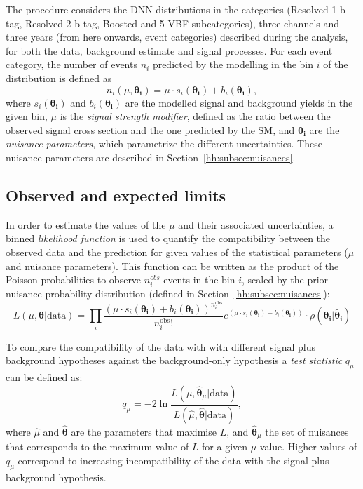 \documentclass[../main.tex]{subfiles}
\begin{document}
The procedure considers the DNN distributions in the categories (Resolved 1 b-tag, Resolved 2 b-tag, Boosted and 5 VBF subcategories), three channels and three years (from here onwards, event categories) described during the analysis, for both the data, background estimate and signal processes. For each event category, the number of events $n_i$ predicted by the modelling in the bin $i$ of the distribution is defined as
\begin{equation}
n_i(\mu, \boldsymbol{\theta_i})=\mu\cdot s_i (\boldsymbol{\theta_i}) + b_i(\boldsymbol{\theta_i}),
\end{equation}
where $s_i (\boldsymbol{\theta_i})$ and $b_i(\boldsymbol{\theta_i})$ are the modelled signal and background yields in the given bin, $\mu$ is the \textit{signal strength modifier}, defined as the ratio between the observed signal cross section and the one predicted by the SM, and $\boldsymbol{\theta_i}$ are the \textit{nuisance parameters}, which parametrize the different uncertainties. These nuisance parameters are described in Section~\ref{hh:subsec:nuisances}.

\subsection{Observed and expected limits}

In order to estimate the values of the $\mu$ and their associated uncertainties, a binned \textit{likelihood function} is used to quantify the compatibility between the observed data and the prediction for given values of the statistical parameters ($\mu$ and nuisance parameters). This function can be written as the product of the Poisson probabilities to observe $n_i^{obs}$ events in the bin $i$, scaled by the prior nuisance probability distribution (defined in Section~\ref{hh:subsec:nuisances}):
\begin{equation}
L(\mu, \boldsymbol{\theta} | \text{data}) = \prod_i \frac{\left(\mu\cdot s_i (\boldsymbol{\theta_i}) + b_i(\boldsymbol{\theta_i}) \right)^{n_i^\text{obs}}}{n_i^\text{obs}!}e^{(\mu\cdot s_i (\boldsymbol{\theta_i}) + b_i(\boldsymbol{\theta_i}))} \cdot \rho(\boldsymbol{\theta_i}|\boldsymbol{\tilde{\theta_i}})
\end{equation}

To compare the compatibility of the data with  with different signal plus background hypotheses against the background-only hypothesis a \textit{test statistic} $q_\mu$ can be defined as:
\begin{equation}
q_\mu = -2 \ln \frac{L(\mu, \boldsymbol{\hat{\theta}}_\mu | \text{data})}{L(\hat{\mu}, \boldsymbol{\hat{\theta}} | \text{data})},
\end{equation}
where $\hat{\mu}$ and $\boldsymbol{\hat{\theta}}$ are the parameters that maximise $L$, and $\boldsymbol{\hat{\theta}}_\mu$ the set of nuisances that corresponds to the maximum value of $L$ for a given $\mu$ value. Higher values of $q_\mu$ correspond to increasing incompatibility of the data with the signal plus background hypothesis.
\end{document}
